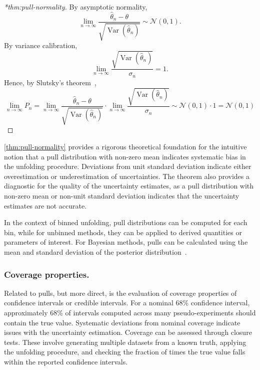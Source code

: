             \begin{proof}[*thm:pull-normality]
            By asymptotic normality,
            \[
                \lim_{n\to\infty} \frac{\hat\theta_n-\theta}{\sqrt{\operatorname{Var}(\hat\theta_n)}} \sim \mathcal N(0,1).
            \]
            By variance calibration,
            \[
                \lim_{n\to\infty} \frac{\sqrt{\operatorname{Var}(\hat\theta_n)}}{\sigma_n} = 1.
            \]
            Hence, by Slutsky's theorem~\cite{slutsky_uber_1925},
            \[
              \lim_{n\to\infty} P_n 
              = \lim_{n\to\infty} \frac{\hat\theta_n-\theta}{\sqrt{\operatorname{Var}(\hat\theta_n)}}
                \cdot \lim_{n\to\infty} \frac{\sqrt{\operatorname{Var}(\hat\theta_n)}}{\sigma_n}
              \sim \mathcal N(0,1)\cdot 1 
              = \mathcal N(0,1)
            \]
            \end{proof}

            \cref{thm:pull-normality} provides a rigorous theoretical foundation for the intuitive notion that a pull distribution with non-zero mean indicates systematic bias in the unfolding procedure. 
            Deviations from unit standard deviation indicate either overestimation or underestimation of uncertainties.
            The theorem also provides a diagnostic for the quality of the uncertainty estimates, as a pull distribution with non-zero mean or non-unit standard deviation indicates that the uncertainty estimates are not accurate.
            
            In the context of binned unfolding, pull distributions can be computed for each bin, while for unbinned methods, they can be applied to derived quantities or parameters of interest.
            For Bayesian methods, pulls can be calculated using the mean and standard deviation of the posterior distribution~\cite{Knapik2012BayesianPriors}.
        
        \subsubsection{Coverage properties.}
            Related to pulls, but more direct, is the evaluation of coverage properties of confidence intervals or credible intervals.
            For a nominal 68\% confidence interval, approximately 68\% of intervals computed across many pseudo-experiments should contain the true value.
            Systematic deviations from nominal coverage indicate issues with the uncertainty estimation.
            Coverage can be assessed through closure tests. These involve generating multiple datasets from a known truth, applying the unfolding procedure, and checking the fraction of times the true value falls within the reported confidence intervals.
            
